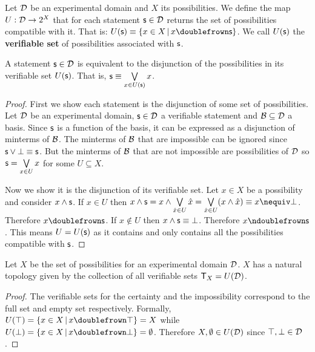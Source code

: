 \documentclass[11pt,letterpaper,fleqn]{memoir} %
\begin{document}
\begin{mathSection}
	
\begin{defn}
	Let $\mathcal{D}$ be an experimental domain and $X$ its possibilities. We define the map $U : \mathcal{D} \rightarrow 2^X$ that for each statement $\mathsf{s} \in \mathcal{D}$ returns the set of possibilities compatible with it. That is: $U(\stmt)\equiv\{ x \in X \, | \, x \comp \stmt\}$. We call $U(\mathsf{s})$ the \textbf{verifiable set} of possibilities associated with $\mathsf{s}$.
\end{defn}

\begin{prop}
	A statement $\mathsf{s} \in \mathcal{D}$ is equivalent to the disjunction of the possibilities in its verifiable set $U(\mathsf{s})$. That is, $\mathsf{s} \equiv \bigvee\limits_{x \in U(\mathsf{s})} x$.
\end{prop}
\begin{proof}
	First we show each statement is the disjunction of some set of possibilities. Let $\mathcal{D}$ be an experimental domain, $\mathsf{s} \in \mathcal{D}$ a verifiable statement and $\mathcal{B} \subseteq \mathcal{D}$ a basis. Since $\mathsf{s}$ is a function of the basis, it can be expressed as a disjunction of minterms of $\mathcal{B}$. The minterms of $\mathcal{B}$ that are impossible can be ignored since $\mathsf{s} \vee \bot \equiv \mathsf{s}$. But the minterms of $\mathcal{B}$ that are not impossible are possibilities of $\mathcal{D}$ so $\mathsf{s}=\bigvee\limits_{x \in U} x$ for some $U \subseteq X$.
	
	Now we show it is the disjunction of its verifiable set. Let $x \in X$ be a possibility and consider $x \wedge \mathsf{s}$. If $x\in U$ then $x \AND \stmt = x \AND \bigOR\limits_{\hat{x} \in U} \hat{x} = \bigOR\limits_{\hat{x} \in U} ( x \AND \hat{x}) \equiv x \nequiv \impossibility$. Therefore $x \comp \stmt$. If $x \notin U$ then $x \wedge \mathsf{s} \equiv \bot$. Therefore $x \ncomp \stmt$. This means $U=U(\mathsf{s})$ as it contains and only contains all the possibilities compatible with $\mathsf{s}$.
\end{proof}

\begin{prop}
	Let $X$ be the set of possibilities for an experimental domain $\mathcal{D}$. $X$ has a natural topology given by the collection of all verifiable sets $\mathsf{T}_X=U(\mathcal{D})$.
\end{prop}

\begin{proof}
	The verifiable sets for the certainty and the impossibility correspond to the full set and empty set respectively. Formally, $U(\certainty) = \{ x \in X \, | \, x \comp \certainty\} = X$ while $U(\impossibility) = \{ x \in X \, | \, x \comp \impossibility\} = \emptyset$. Therefore $X, \emptyset \in U(\mathcal{D})$ since $\top, \bot \in \mathcal{D}$.


\end{proof}
\end{mathSection}
\end{document}
